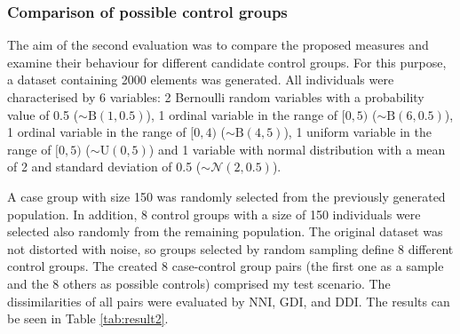 	\subsubsection{Comparison of possible control groups}
	\label{subseq:comparison}
				
	The aim of the second evaluation was to compare the proposed measures and examine their behaviour for different candidate control groups. For this purpose, a dataset containing 2000 elements was generated. All individuals were characterised by 6 variables: 2 Bernoulli random variables with a probability value of 0.5 ($\mathtt{\sim} \textrm{B}(1, 0.5)$), 1 ordinal variable in the range of $[0,5)$ ($\mathtt{\sim} \textrm{B}(6, 0.5)$), 1 ordinal variable in the range of $[0,4)$ ($\mathtt{\sim} \textrm{B}(4, 5)$), 1 uniform variable in the range of $[0,5)$ ($\mathtt{\sim} \textrm{U}(0, 5)$) and 1 variable with normal distribution with a mean of 2 and standard deviation of 0.5 ($\mathtt{\sim} \mathcal{N}(2, 0.5)$).
								
		A case group with size 150 was randomly selected from the previously generated population. In addition, 8 control groups with a size of 150 individuals were selected also randomly from the remaining population. The original dataset was not distorted with noise, so groups selected by random sampling define 8 different control groups. The created 8 case-control group pairs (the first one as a sample and the 8 others as possible controls) comprised my test scenario. The dissimilarities of all pairs were evaluated by NNI, GDI, and DDI. The results can be seen in Table \ref{tab:result2}.
								
